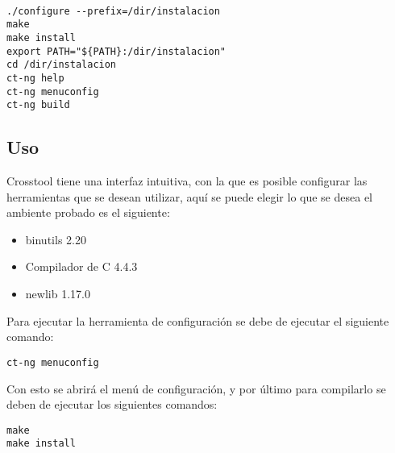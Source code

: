 \begin{verbatim}

./configure --prefix=/dir/instalacion
make
make install
export PATH="${PATH}:/dir/instalacion"
cd /dir/instalacion
ct-ng help
ct-ng menuconfig
ct-ng build

\end{verbatim}

\subsection{Uso}

Crosstool tiene una interfaz intuitiva, con la que es posible configurar las herramientas que se desean utilizar, aquí se puede elegir lo que se desea el ambiente probado es el siguiente:

\begin{itemize}
\item binutils 2.20
\item Compilador de C 4.4.3
\item newlib 1.17.0
\end{itemize}

Para ejecutar la herramienta de configuración se debe de ejecutar el siguiente comando:

\begin{verbatim}
ct-ng menuconfig
\end{verbatim}

Con esto se abrirá el menú de configuración, y por último para compilarlo se deben de ejecutar los siguientes comandos:

\begin{verbatim}
make
make install
\end{verbatim}

